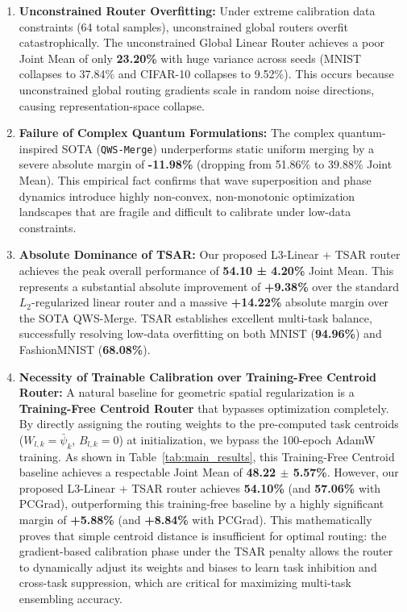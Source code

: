 \begin{enumerate}
  \item \textbf{Unconstrained Router Overfitting:} Under extreme calibration data constraints (64
total samples), unconstrained global routers overfit catastrophically. The unconstrained Global
Linear Router achieves a poor Joint Mean of only \textbf{23.20\%} with huge variance across seeds
(MNIST collapses to 37.84\% and CIFAR-10 collapses to 9.52\%). This occurs because unconstrained
global routing gradients scale in random noise directions, causing representation-space collapse.
  \item \textbf{Failure of Complex Quantum Formulations:} The complex quantum-inspired SOTA
(\texttt{QWS-Merge}) underperforms static uniform merging by a severe absolute margin of
\textbf{-11.98\%} (dropping from 51.86\% to 39.88\% Joint Mean). This empirical fact confirms that
wave superposition and phase dynamics introduce highly non-convex, non-monotonic optimization
landscapes that are fragile and difficult to calibrate under low-data constraints.
  \item \textbf{Absolute Dominance of TSAR:} Our proposed L3-Linear + TSAR router achieves the peak
overall performance of \textbf{54.10 ± 4.20\%} Joint Mean. This represents a substantial absolute
improvement of \textbf{+9.38\%} over the standard $L_2$-regularized linear router and a massive
\textbf{+14.22\%} absolute margin over the SOTA QWS-Merge. TSAR establishes excellent multi-task
balance, successfully resolving low-data overfitting on both MNIST (\textbf{94.96\%}) and
FashionMNIST (\textbf{68.08\%}).
  \item \textbf{Necessity of Trainable Calibration over Training-Free Centroid Router:} A natural
baseline for geometric spatial regularization is a \textbf{Training-Free Centroid Router} that
bypasses optimization completely. By directly assigning the routing weights to the pre-computed task
centroids ($W_{l,k} = \bar{\psi}_k$, $B_{l,k}=0$) at initialization, we bypass the 100-epoch AdamW
training. As shown in Table~\ref{tab:main_results}, this Training-Free Centroid baseline achieves a
respectable Joint Mean of \textbf{48.22 $\pm$ 5.57\%}. However, our proposed L3-Linear + TSAR router
achieves \textbf{54.10\%} (and \textbf{57.06\%} with PCGrad), outperforming this training-free
baseline by a highly significant margin of \textbf{+5.88\%} (and \textbf{+8.84\%} with PCGrad). This
mathematically proves that simple centroid distance is insufficient for optimal routing: the
gradient-based calibration phase under the TSAR penalty allows the router to dynamically adjust its
weights and biases to learn task inhibition and cross-task suppression, which are critical for
maximizing multi-task ensembling accuracy.
\end{enumerate}

